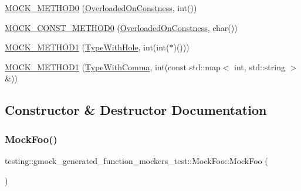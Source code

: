 \begin{DoxyCompactItemize}
\item 
\mbox{\hyperlink{classtesting_1_1gmock__generated__function__mockers__test_1_1MockFoo_a291ff46b043d00d0f0acb081c5c36f2e}{M\+O\+C\+K\+\_\+\+M\+E\+T\+H\+O\+D0}} (\mbox{\hyperlink{classtesting_1_1gmock__generated__function__mockers__test_1_1FooInterface_afbbe6ec72ae237de05e109dea5b03f4f}{Overloaded\+On\+Constness}}, int())
\item 
\mbox{\hyperlink{classtesting_1_1gmock__generated__function__mockers__test_1_1MockFoo_aa0da575ad3061850662c5f401ddb30c2}{M\+O\+C\+K\+\_\+\+C\+O\+N\+S\+T\+\_\+\+M\+E\+T\+H\+O\+D0}} (\mbox{\hyperlink{classtesting_1_1gmock__generated__function__mockers__test_1_1FooInterface_afbbe6ec72ae237de05e109dea5b03f4f}{Overloaded\+On\+Constness}}, char())
\item 
\mbox{\hyperlink{classtesting_1_1gmock__generated__function__mockers__test_1_1MockFoo_a33077a71c1c5178c25b0a4aa099d5f2c}{M\+O\+C\+K\+\_\+\+M\+E\+T\+H\+O\+D1}} (\mbox{\hyperlink{classtesting_1_1gmock__generated__function__mockers__test_1_1FooInterface_a9e92ef227dc68806f85ebff9c8a6102a}{Type\+With\+Hole}}, int(int($\ast$)()))
\item 
\mbox{\hyperlink{classtesting_1_1gmock__generated__function__mockers__test_1_1MockFoo_a3774adcc0155dd4c3b5fd790a6f40261}{M\+O\+C\+K\+\_\+\+M\+E\+T\+H\+O\+D1}} (\mbox{\hyperlink{classtesting_1_1gmock__generated__function__mockers__test_1_1FooInterface_a64544adcb9c502a8fbc3990b53f4c767}{Type\+With\+Comma}}, int(const std\+::map$<$ int, std\+::string $>$ \&))
\end{DoxyCompactItemize}


\subsection{Constructor \& Destructor Documentation}
\mbox{\label{classtesting_1_1gmock__generated__function__mockers__test_1_1MockFoo_a05d4aeb00d75b5dbf627a5db2c0ada7f}} 
\subsubsection{\texorpdfstring{MockFoo()}{MockFoo()}}
{\footnotesize\ttfamily testing\+::gmock\+\_\+generated\+\_\+function\+\_\+mockers\+\_\+test\+::\+Mock\+Foo\+::\+Mock\+Foo (\begin{DoxyParamCaption}{ }\end{DoxyParamCaption})\hspace{0.3cm}{\ttfamily [inline]}}



